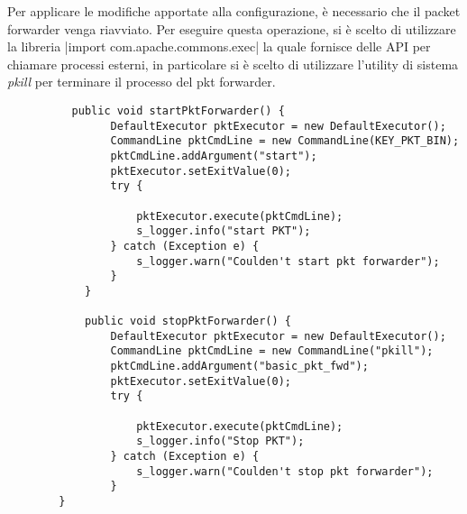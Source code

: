 Per applicare le modifiche apportate alla configurazione, è necessario che
il packet forwarder venga riavviato. Per eseguire questa operazione, si è scelto di
utilizzare la libreria 
|import com.apache.commons.exec|
la quale fornisce delle API per chiamare processi esterni, in particolare
si è scelto di utilizzare l'utility di sistema \emph{pkill} per terminare il
processo del pkt forwarder.
\begin{verbatim}
          public void startPktForwarder() {
                DefaultExecutor pktExecutor = new DefaultExecutor();
                CommandLine pktCmdLine = new CommandLine(KEY_PKT_BIN);
                pktCmdLine.addArgument("start");
                pktExecutor.setExitValue(0);
                try {

                    pktExecutor.execute(pktCmdLine);
                    s_logger.info("start PKT");
                } catch (Exception e) {
                    s_logger.warn("Coulden't start pkt forwarder");
                }
            }

            public void stopPktForwarder() {
                DefaultExecutor pktExecutor = new DefaultExecutor();
                CommandLine pktCmdLine = new CommandLine("pkill");
                pktCmdLine.addArgument("basic_pkt_fwd");
                pktExecutor.setExitValue(0);
                try {

                    pktExecutor.execute(pktCmdLine);
                    s_logger.info("Stop PKT");
                } catch (Exception e) {
                    s_logger.warn("Coulden't stop pkt forwarder");
                }
        }

\end{verbatim}




